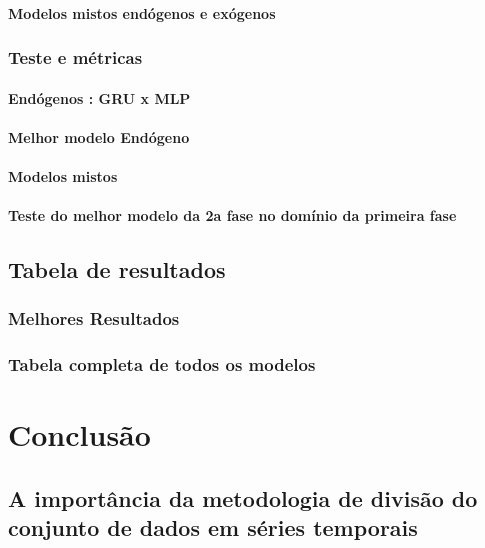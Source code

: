 \documentclass[	12pt, Times, openright, twoside, a4paper, english, brazil]{abntex2}
\begin{document}
    	    \subsubsection{Modelos mistos endógenos e exógenos}
    	\subsection{Teste e métricas}
    	    \subsubsection{Endógenos : GRU x MLP}
    	    \subsubsection{Melhor modelo Endógeno}
    	    \subsubsection{Modelos mistos}
    	    \subsubsection{Teste do melhor modelo da 2a fase no domínio da primeira fase}
    
    \section{Tabela de resultados}
        \subsection{Melhores Resultados}
        \subsection{Tabela completa de todos os modelos}
	    
  \chapter{Conclusão}
    \section{A importância da metodologia de divisão do conjunto de dados em séries temporais}
\end{document}
